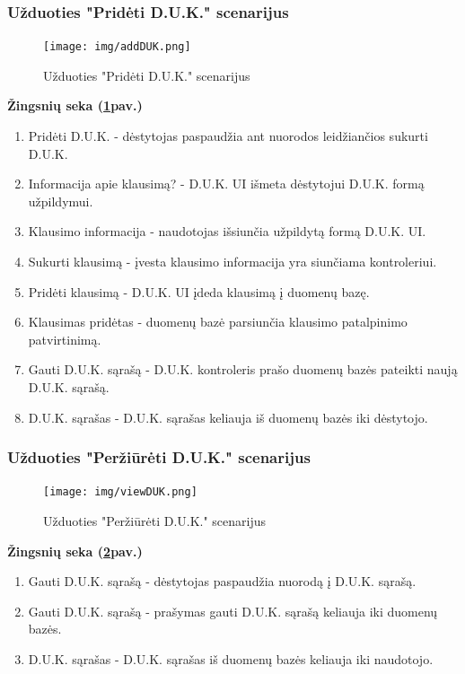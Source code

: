 \documentclass{VUMIFPSkursinis}
\begin{document}
\subsubsection{Užduoties "Pridėti D.U.K." scenarijus}
\begin{figure}[H]
	\centering
	\texttt{[image: img/addDUK.png]}
	\caption{Užduoties "Pridėti D.U.K." scenarijus}
	\label{fig:addDuk}
\end{figure}
\textbf{Žingsnių seka (\ref{fig:addDuk}pav.)}\\
\begin{enumerate}
	\item Pridėti D.U.K. - dėstytojas paspaudžia ant nuorodos leidžiančios sukurti D.U.K.
	\item Informacija apie klausimą? - D.U.K. UI išmeta dėstytojui D.U.K. formą užpildymui.
	\item Klausimo informacija - naudotojas išsiunčia užpildytą formą D.U.K. UI.
	\item Sukurti  klausimą - įvesta klausimo informacija yra siunčiama kontroleriui.
	\item Pridėti klausimą - D.U.K. UI įdeda klausimą į duomenų bazę.
	\item Klausimas pridėtas - duomenų bazė parsiunčia klausimo patalpinimo patvirtinimą.
	\item Gauti D.U.K. sąrašą - D.U.K. kontroleris prašo duomenų bazės pateikti naują D.U.K. sąrašą.
	\item D.U.K. sąrašas - D.U.K. sąrašas keliauja iš duomenų bazės iki dėstytojo.
\end{enumerate}
\subsubsection{Užduoties "Peržiūrėti D.U.K." scenarijus}
\begin{figure}[H]
	\centering
	\texttt{[image: img/viewDUK.png]}
	\caption{Užduoties "Peržiūrėti D.U.K." scenarijus}
	\label{fig:viewDUK}
\end{figure}
\textbf{Žingsnių seka (\ref{fig:viewDUK}pav.)}\\
\begin{enumerate}
	\item Gauti D.U.K. sąrašą - dėstytojas paspaudžia nuorodą į D.U.K. sąrašą.
	\item Gauti D.U.K. sąrašą - prašymas gauti D.U.K. sąrašą keliauja iki duomenų bazės.
	\item D.U.K. sąrašas - D.U.K. sąrašas iš duomenų bazės keliauja iki naudotojo.
\end{enumerate}
\end{document}
